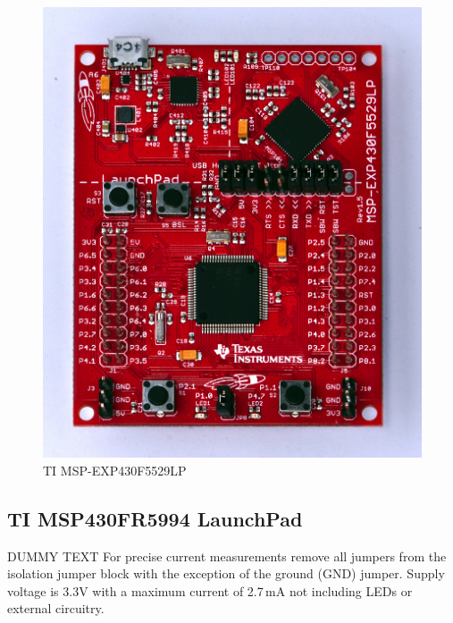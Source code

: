 \documentclass[twoside,11pt]{cergdoc}
\begin{document}
\begin{figure}[ht]
  \begin{center}
    \includegraphics[scale=0.6]{figures/msp-exp430f5529lp}
    \caption{TI MSP-EXP430F5529LP}\label{fig:5529}
  \end{center}
\vspace{-1ex}
\end{figure}

\subsection{TI MSP430FR5994 LaunchPad\texttrademark}

DUMMY TEXT For precise current measurements remove all jumpers from the isolation jumper block 
with the exception of the ground (GND) jumper. Supply voltage is 3.3V with a maximum 
current of 2.7\,mA not including LEDs or external circuitry.
\end{document}
